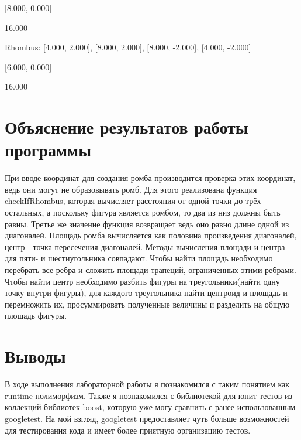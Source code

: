 \documentclass[a4paper, 12pt]{article}
\begin{document}
[8.000, 0.000]

16.000

Rhombus: [4.000, 2.000], [8.000, 2.000], [8.000, -2.000], [4.000, -2.000]

[6.000, 0.000]

16.000

\newpage

\section{Объяснение результатов работы программы}

При вводе координат для создания ромба производится проверка этих координат, ведь они могут не образовывать ромб. Для этого реализована функция checkIfRhombus, которая вычисляет расстояния от одной точки до трёх остальных, а поскольку фигура является ромбом, то два из низ должны быть равны. Третье же значение функция возвращает ведь оно равно длине одной из диагоналей. Площадь ромба вычисляется как половина произведения диагоналей, центр - точка пересечения диагоналей. Методы вычисления площади и центра для пяти- и шестиугольника совпадают. Чтобы найти площадь необходимо перебрать все ребра и сложить площади трапеций, ограниченных этими ребрами. Чтобы найти центр необходимо разбить фигуры на треугольники(найти одну точку внутри фигуры), для каждого треугольника найти центроид и площадь и перемножить их, просуммировать полученные величины и разделить на общую площадь фигуры.   

\newpage
\section{Выводы}

В ходе выполнения лабораторной работы я познакомился с таким  понятием как runtime-полиморфизм. Также я познакомился с библиотекой для юнит-тестов из коллекций библиотек boost, которую уже могу сравнить с ранее использованным googletest. На мой взгляд, googletest предоставляет чуть больше возможностей для тестирования кода и имеет более приятную организацию тестов.
\end{document}
